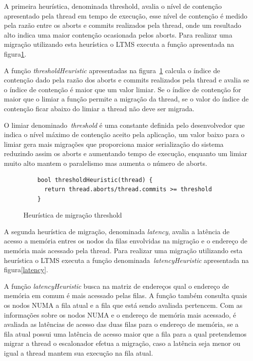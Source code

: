 \documentclass[diss,capa]{texufpel}
\begin{document}
A primeira heurística, denominada threshold, avalia o nível de contenção apresentado pela thread em tempo de execução, esse nível de contenção é medido pela razão entre os aborts e commits realizados pela thread, onde um resultado alto indica uma maior contenção ocasionada pelos aborts. Para realizar uma migração utilizando esta heurística o LTMS executa a função apresentada na figura\ref{threshold}.

A função \emph{thresholdHeuristic} apresentadas na figura~\ref{threshold} calcula o índice de contenção dado pela razão dos aborts e commits realizados pela thread e avalia se o índice de contenção é maior que um valor limiar. Se o índice de contenção for maior que o limiar a função permite a migração da thread, se o valor do índice de contenção ficar abaixo do limiar a thread não deve ser migrada.

O limiar denominado~\emph{threshold} é uma constante definida pelo desenvolvedor que indica o nível máximo de contenção aceito pela aplicação, um valor baixo para o limiar gera mais migrações que proporciona maior serialização do sistema reduzindo assim os aborts e aumentando tempo de execução, enquanto um limiar muito alto mantem o paralelismo mas aumenta o número de aborts.

\begin{figure}[htbp]
  \centering
  \begin{lstlisting}
    bool thresholdHeuristic(thread) {
      return thread.aborts/thread.commits >= threshold
    }
  \end{lstlisting}
  \caption{Heurística de migração threshold}
  \label{threshold}
\end{figure}

A segunda heurística de migração, denominada \emph{latency}, avalia a latência de acesso a memória entres os nodos da filas envolvidas na migração e o endereço de memória mais acessado pela thread. Para realizar uma migração utilizando esta heurística o LTMS executa a função denominada~\emph{latencyHeuristic} apresentada na figura\ref{latency}.

A função \emph{latencyHeuristic} busca na matriz de endereços qual o endereço de memória em comum é mais acessado pelas filas. A função também consulta quais os nodos NUMA a fila atual e a fila que está sendo avaliada pertencem. Com as informações sobre os nodos NUMA e o endereço de memória mais acessado, é avaliada as latências de acesso das duas filas para o endereço de memória, se a fila atual possui uma latência de acesso maior que a fila para a qual pretendemos migrar a thread o escalonador efetua a migração, caso a latência seja menor ou igual a thread mantem sua execução na fila atual.
\end{document}
